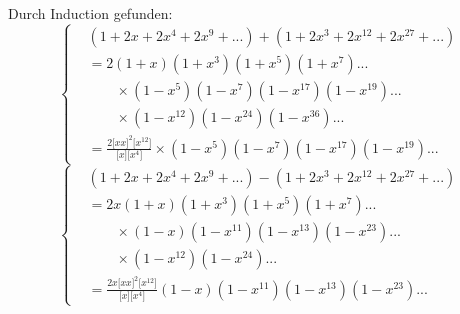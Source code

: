 \begingroup
\makeatletter\tagsleft@true\let\veqno\@@leqno\makeatother
\newcommand{\TransBracket}[1]{\boldsymbol{[}#1\boldsymbol{]}}
\noindent{\small[S. 45]}\par
\par\indent Durch Induction gefunden:
\begin{equation*}\tag*{[7]}
\left\{\begin{aligned}
&(1+2x+2x^4+2x^9+{.}{.}{.})+(1+2x^3+2x^{12}+2x^{27}+{.}{.}{.})\\
&=2(1+x)(1+x^3)(1+x^5)(1+x^7){.}{.}{.}\\
&\qquad\times(1-x^5)(1-x^7)(1-x^{17})(1-x^{19}){.}{.}{.}\\
&\qquad\times(1-x^{12})(1-x^{24})(1-x^{36}){.}{.}{.}\\
&=\frac{2\TransBracket{xx}^2\TransBracket{x^{12}}}{\TransBracket{x}\TransBracket{x^4}}
\times(1-x^5)(1-x^7)(1-x^{17})(1-x^{19}){.}{.}{.}
\end{aligned}\right.
\end{equation*}
\begin{equation*}\tag*{[8]}
\left\{\begin{aligned}
&(1+2x+2x^4+2x^9+{.}{.}{.})-(1+2x^3+2x^{12}+2x^{27}+{.}{.}{.})\\
&=2x(1+x)(1+x^3)(1+x^5)(1+x^7){.}{.}{.}\\
&\qquad\times(1-x)(1-x^{11})(1-x^{13})(1-x^{23}){.}{.}{.}\\
&\qquad\times(1-x^{12})(1-x^{24}){.}{.}{.}\\
&=\frac{2x\TransBracket{xx}^2\TransBracket{x^{12}}}{\TransBracket{x}\TransBracket{x^4}}
(1-x)(1-x^{11})(1-x^{13})(1-x^{23}){.}{.}{.}
\end{aligned}\right.
\end{equation*}
\clearpage
\endgroup
